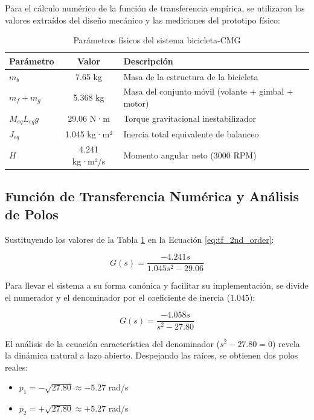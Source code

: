 \documentclass[12pt,letterpaper]{report}
\begin{document}
Para el cálculo numérico de la función de transferencia empírica, se utilizaron los valores extraídos del diseño mecánico y las mediciones del prototipo físico:

\begin{table}[H]
\centering
\caption{Parámetros físicos del sistema bicicleta-CMG}
\label{tab:parametros_sistema}
\begin{tabular}{|l|c|l|}
\hline
\textbf{Parámetro} & \textbf{Valor} & \textbf{Descripción} \\
\hline
$m_b$ & 7.65 kg & Masa de la estructura de la bicicleta \\
\hline
$m_f + m_g$ & 5.368 kg & Masa del conjunto móvil (volante + gimbal + motor) \\
\hline
$M_{eq}L_{eq}g$ & 29.06 N·m & Torque gravitacional inestabilizador \\
\hline
$J_{eq}$ & 1.045 kg·m² & Inercia total equivalente de balanceo \\
\hline
$H$ & 4.241 kg·m²/s & Momento angular neto ($3000$ RPM) \\
\hline
\end{tabular}
\end{table}

\subsection*{Función de Transferencia Numérica y Análisis de Polos}

Sustituyendo los valores de la Tabla \ref{tab:parametros_sistema} en la Ecuación \ref{eq:tf_2nd_order}:

\begin{equation}
    G(s) = \frac{-4.241s}{1.045s^2 - 29.06}
\end{equation}

Para llevar el sistema a su forma canónica y facilitar su implementación, se divide el numerador y el denominador por el coeficiente de inercia ($1.045$):

\begin{equation}
    G(s) = \frac{-4.058s}{s^2 - 27.80}
\end{equation}

El análisis de la ecuación característica del denominador ($s^2 - 27.80 = 0$) revela la dinámica natural a lazo abierto. Despejando las raíces, se obtienen dos polos reales:
\begin{itemize}
    \item $p_1 = -\sqrt{27.80} \approx -5.27$ rad/s
    \item $p_2 = +\sqrt{27.80} \approx +5.27$ rad/s
\end{itemize}
\end{document}
